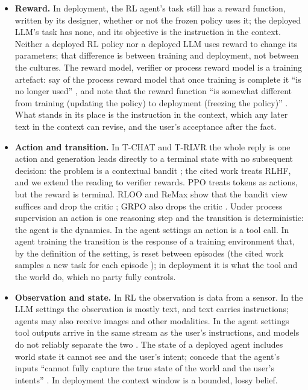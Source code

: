 \documentclass{article}
\providecommand{\tightlist}{\setlength{\itemsep}{0pt}\setlength{\parskip}{0pt}}
\begin{document}
\begin{itemize}
\tightlist
\item
  \textbf{Reward.} In deployment, the RL agent's task still has a reward function, written by its designer, whether or not the frozen policy uses it; the deployed LLM's task has none, and its objective is the instruction in the context. Neither a deployed RL policy nor a deployed LLM uses reward to change its parameters; that difference is between training and deployment, not between the cultures. The reward model, verifier or process reward model is a training artefact: \citet{mclean2026} say of the process reward model that once training is complete it ``is no longer used'' \citep{mclean2026}, and note that the reward function ``is somewhat different from training (updating the policy) to deployment (freezing the policy)'' \citep{mclean2026}. What stands in its place is the instruction in the context, which any later text in the context can revise, and the user's acceptance after the fact.
\item
  \textbf{Action and transition.} In T-CHAT and T-RLVR the whole reply is one action and generation leads directly to a terminal state with no subsequent decision: the problem is a contextual bandit \citep{ahmadian2024, xiong2024}; the cited work treats RLHF, and we extend the reading to verifier rewards. PPO treats tokens as actions, but the reward is terminal. RLOO and ReMax show that the bandit view suffices and drop the critic \citep{ahmadian2024, li2024}; GRPO also drops the critic \citep{shao2024}. Under process supervision an action is one reasoning step and the transition is deterministic: the agent is the dynamics. In the agent settings an action is a tool call. In agent training the transition is the response of a training environment that, by the definition of the setting, is reset between episodes (the cited work samples a new task for each episode \citep{zhou2024b}); in deployment it is what the tool and the world do, which no party fully controls.
\item
  \textbf{Observation and state.} In RL the observation is data from a sensor. In the LLM settings the observation is mostly text, and text carries instructions; agents may also receive images and other modalities. In the agent settings tool outputs arrive in the same stream as the user's instructions, and models do not reliably separate the two \citep{zverev2025, greshake2023}. The state of a deployed agent includes world state it cannot see and the user's intent; \citet{mclean2026} concede that the agent's inputs ``cannot fully capture the true state of the world and the user's intents'' \citep{mclean2026}. In deployment the context window is a bounded, lossy belief.

\end{itemize}
\end{document}
